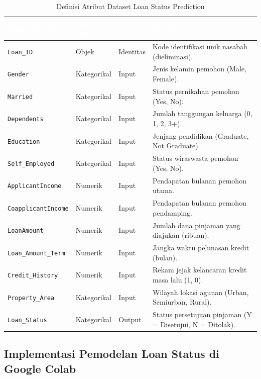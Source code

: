 \documentclass[a4paper,oneside,12pt]{report}
\newcommand{\thead}[1]{\textcolor{white}{\textbf{#1}}}
\begin{document}
\begin{table}[H]
\centering
\caption{Definisi Atribut Dataset Loan Status Prediction}
\label{tab:loan_attributes}
\vspace{0.2cm}
\footnotesize
{}
\begin{tabularx}{\textwidth}{l l l X}
\toprule
\rowcolor{darkblue}
\thead{Nama Atribut} & \thead{Tipe Data} & \thead{Peran} & \thead{Keterangan} \\
\midrule
\texttt{Loan\_ID} & Objek & Identitas & Kode identifikasi unik nasabah (dieliminasi). \\
\texttt{Gender} & Kategorikal & Input & Jenis kelamin pemohon (Male, Female). \\
\texttt{Married} & Kategorikal & Input & Status pernikahan pemohon (Yes, No). \\
\texttt{Dependents} & Kategorikal & Input & Jumlah tanggungan keluarga (0, 1, 2, 3+). \\
\texttt{Education} & Kategorikal & Input & Jenjang pendidikan (Graduate, Not Graduate). \\
\texttt{Self\_Employed} & Kategorikal & Input & Status wiraswasta pemohon (Yes, No). \\
\texttt{ApplicantIncome} & Numerik & Input & Pendapatan bulanan pemohon utama. \\
\texttt{CoapplicantIncome} & Numerik & Input & Pendapatan bulanan pemohon pendamping. \\
\texttt{LoanAmount} & Numerik & Input & Jumlah dana pinjaman yang diajukan (ribuan). \\
\texttt{Loan\_Amount\_Term} & Numerik & Input & Jangka waktu pelunasan kredit (bulan). \\
\texttt{Credit\_History} & Numerik & Input & Rekam jejak kelancaran kredit masa lalu (1, 0). \\
\texttt{Property\_Area} & Kategorikal & Input & Wilayah lokasi agunan (Urban, Semiurban, Rural). \\
\texttt{Loan\_Status} & Kategorikal & Output & Status persetujuan pinjaman (Y = Disetujui, N = Ditolak). \\
\bottomrule
\end{tabularx}
\end{table}

\subsection{Implementasi Pemodelan Loan Status di Google Colab}
\end{document}
